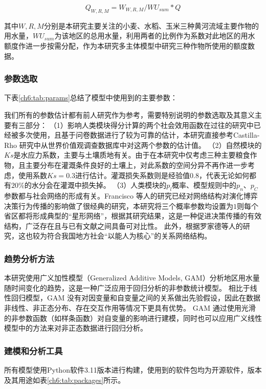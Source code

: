 \begin{equation}
    Q_{W, R, M} = W_{W, R, M} / WU_{sum} * Q
\end{equation}

其中$W, R, M$分别是本研究主要关注的小麦、水稻、玉米三种黄河流域主要作物的用水量，$WU_{sum}$为该地区的总用水量，利用两者的比例作为系数对此地区的用水额度作进一步按需分配，作为本研究多主体模型中研究三种作物所使用的额度数据。



\subsubsection*{参数选取}

下表\ref{ch6:tab:params}总结了模型中使用到的主要参数：



我们所有的参数估计都有前人研究作为参考，需要特别说明的参数选取及其意义主要有三部分：
（1）影响人类模块得分计算的两个社会效用函数在过往的研究中已经被多次使用，且基于问卷数据进行了较为可靠的估计，本研究直接参考Castilla-Rho 研究中从世界价值观调查数据库中对这两个参数的估计值\cite{castilla-rho2015, castilla-rho2017, castilla-rho2020}。
（2）自然模块的$Ks$是水应力系数，主要与土壤质地有关。由于在本研究中仅考虑三种主要粮食作物，且主要分布在灌溉条件良好的土壤上，对此系数的空间分异不再作进一步考虑，使用系数$Ks = 0.3$进行估计。灌溉损失系数则是经验值$0.8$，代表无论如何都有$20\%$的水分会在灌溉中损失掉。
（3）人类模块的$p_l$概率、模型规则中的$p_n$、$p_C$参数都与社会网络的形成有关。Francisco 等人的研究已经对网络结构对演化博弈决策行为传播的影响做了很经典的研究，本研究将三个概率参数均设置为$1$则每个省区都将形成典型的“星形网络”，根据其研究结果，这是一种促进决策传播的有效结构，广泛存在且与已有文献之间具备可对比性\cite{santos2008}。
此外，根据罗家德等人的研究，这也较为符合我国地方社会“以能人为核心”的关系网络结构\cite{luojiade2013}。


\subsubsection*{趋势分析方法}

本研究使用广义加性模型（Generalized Additive Models, GAM）分析地区用水量随时间变化的趋势，这是一种广泛应用于回归分析的非参数统计模型。
相比于线性回归模型，GAM 没有对因变量和自变量之间的关系做出先验假设，因此在数据非线性、非正态分布、存在交互作用等情况下更具有优势。
GAM 通过使用光滑的非参数函数（如样条函数）对自变量的影响进行建模，同时也可以应用广义线性模型中的方法来对非正态数据进行回归分析。


\subsubsection*{建模和分析工具}

所有模型使用Python软件3.11版本进行构建，使用到的软件包均为开源软件，版本及其用途如表\ref{ch6:tab:packages}所示。


